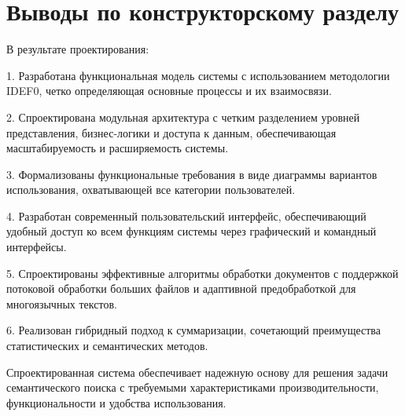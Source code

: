 \section{Выводы по конструкторскому разделу}

В результате проектирования:

1. Разработана функциональная модель системы с использованием методологии IDEF0, четко определяющая основные процессы и их взаимосвязи.

2. Спроектирована модульная архитектура с четким разделением уровней представления, бизнес-логики и доступа к данным, обеспечивающая масштабируемость и расширяемость системы.

3. Формализованы функциональные требования в виде диаграммы вариантов использования, охватывающей все категории пользователей.

4. Разработан современный пользовательский интерфейс, обеспечивающий удобный доступ ко всем функциям системы через графический и командный интерфейсы.

5. Спроектированы эффективные алгоритмы обработки документов с поддержкой потоковой обработки больших файлов и адаптивной предобработкой для многоязычных текстов.

6. Реализован гибридный подход к суммаризации, сочетающий преимущества статистических и семантических методов.

Спроектированная система обеспечивает надежную основу для решения задачи семантического поиска с требуемыми характеристиками производительности, функциональности и удобства использования.

\clearpage